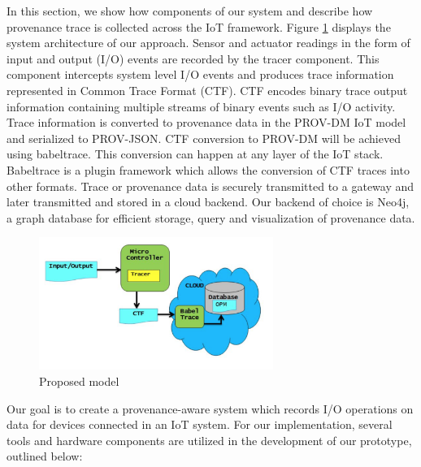 In this section, we show how components of our system and describe how provenance trace is collected across the IoT framework. Figure \ref{architecture} displays the system architecture of our approach. Sensor and actuator readings in the form of input and output (I/O) events are recorded by the tracer component. This component intercepts system level I/O events and produces trace information represented in Common Trace Format (CTF). CTF encodes binary trace output information containing multiple streams of binary events such as I/O activity. Trace information is converted to provenance data in the PROV-DM IoT model and serialized to PROV-JSON. CTF conversion to PROV-DM will be achieved using babeltrace. This conversion can happen at any layer of the IoT stack.  Babeltrace is a plugin framework which allows the conversion of CTF traces into other formats. Trace or provenance data is securely transmitted to a gateway and later transmitted and stored in a cloud backend. Our backend of choice is Neo4j, a graph database for efficient storage, query and visualization of provenance data.


\begin{figure}[h]
\begin{center}

\includegraphics[width =3.0in]{architecture.PNG}    
\end{center}
\caption{Proposed model}
\label{architecture}
\end{figure}

Our goal is to create a provenance-aware system which records I/O operations on data for devices connected in an IoT system. For our implementation, several tools and hardware components are utilized in the development of our prototype, outlined below:


